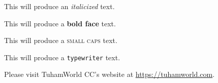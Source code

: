 \documentclass[11pt]{article}
\begin{document}
This will produce an \textit{italicized} text.

\vspace{0.5cm}

This will produce a \textbf{bold face} text.

\vspace{0.5cm}

This will produce a \textsc{small caps} text.

\vspace{0.5cm}

This will produce a \texttt{typewriter} text.

\vspace{0.5cm}

Please visit TuhamWorld CC's website at \url{https://tuhamworld.com}.
\end{document}
